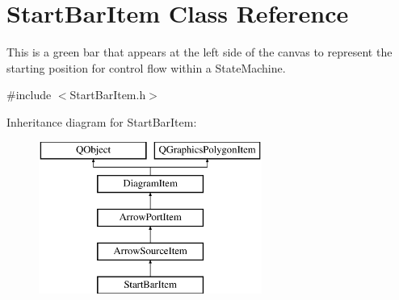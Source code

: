 \hypertarget{class_start_bar_item}{\section{Start\-Bar\-Item Class Reference}
\label{class_start_bar_item}
}


This is a green bar that appears at the left side of the canvas to represent the starting position for control flow within a State\-Machine.  




{\ttfamily \#include $<$Start\-Bar\-Item.\-h$>$}

Inheritance diagram for Start\-Bar\-Item\-:\begin{figure}[H]
\begin{center}
\leavevmode
\includegraphics[height=5.000000cm]{class_start_bar_item}
\end{center}
\end{figure}

